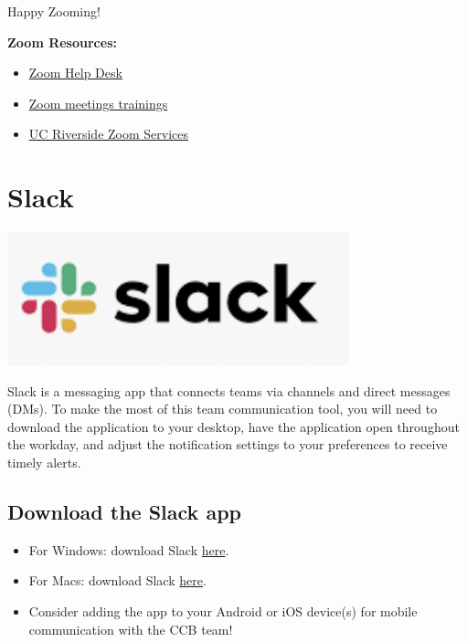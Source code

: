 \documentclass[
]{book}
\providecommand{\tightlist}{%
  \setlength{\itemsep}{0pt}\setlength{\parskip}{0pt}}
\begin{document}
Happy Zooming!

\textbf{Zoom Resources:}

\begin{itemize}
\tightlist
\item
  \href{https://support.zoom.us/hc/en-us}{Zoom Help Desk}
\item
  \href{https://livetraining.zoom.us/rec/play/6Zx8f-j7qDw3GNeQswSDAPJ-W9S4J6qshiYfqfcNyk20WyIHNFChb7pHZuClKrDVR76R1BxgtMF4txaS?continueMode=true}{Zoom meetings trainings}
\item
  \href{https://ucr.zoom.us/}{UC Riverside Zoom Services}
\end{itemize}

\hypertarget{slack}{%
\section{Slack}\label{slack}}

\begin{flushleft}\includegraphics{images/slack} \end{flushleft}

Slack is a messaging app that connects teams via channels and direct messages (DMs). To make the most of this team communication tool, you will need to download the application to your desktop, have the application open throughout the workday, and adjust the notification settings to your preferences to receive timely alerts.

\hypertarget{download-the-slack-app}{%
\subsection{Download the Slack app}\label{download-the-slack-app}}

\begin{itemize}
\tightlist
\item
  For Windows: download Slack \href{https://slack.com/downloads/windows}{here}.
\item
  For Macs: download Slack \href{https://slack.com/downloads/mac}{here}.
\item
  Consider adding the app to your Android or iOS device(s) for mobile communication with the CCB team!
\end{itemize}
\end{document}
